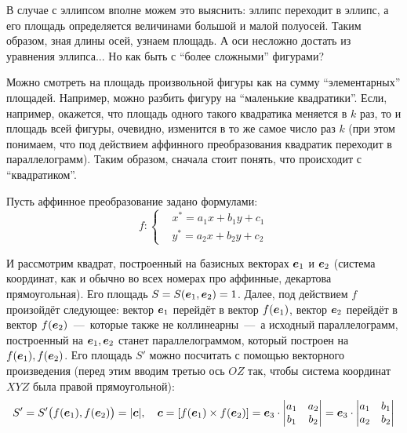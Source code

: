 \documentclass[a4paper,12pt]{article}
\begin{document}
  В случае с эллипсом вполне можем это выяснить: эллипс переходит в эллипс, а его площадь определяется величинами большой и малой полуосей.
  Таким образом, зная длины осей, узнаем площадь.
  А оси несложно достать из уравнения эллипса...
  Но как быть с ``более сложными'' фигурами?
  
  Можно смотреть на площадь произвольной фигуры как на сумму ``элементарных'' площадей.
  Например, можно разбить фигуру на ``маленькие квадратики''.
  Если, например, окажется, что площадь одного такого квадратика меняется в $k$ раз, то и площадь всей фигуры, очевидно, изменится в то же самое число раз $k$ (при этом понимаем, что под действием аффинного преобразования квадратик переходит в параллелограмм).
  Таким образом, сначала стоит понять, что происходит с ``квадратиком''.
  
  Пусть аффинное преобразование задано формулами:
  \begin{equation}\label{eq:affine-for-square-and-length}
    f\colon \left\{
      \begin{aligned}
        &x^* = a_1 x + b_1 y + c_1\\
        &y^* = a_2 x + b_2 y + c_2
      \end{aligned}
    \right.
  \end{equation}
  
  И рассмотрим квадрат, построенный на базисных векторах $\boldsymbol e_1$ и $\boldsymbol e_2$ (система координат, как и обычно во всех номерах про аффинные, декартова прямоугольная).
  Его площадь $S \hm= S(\bds e_1, \bds e_2) \hm= 1$.
  Далее, под действием $f$ произойдёт следующее: вектор $\boldsymbol e_1$ перейдёт в вектор $f(\boldsymbol e_1)$, вектор $\boldsymbol e_2$ перейдёт в вектор $f(\boldsymbol e_2)$~---~которые также не коллинеарны~---~а исходный параллелограмм, построенный на $\boldsymbol e_1, \boldsymbol e_2$ станет параллелограммом, который построен на $f(\boldsymbol e_1), f(\boldsymbol e_2)$.
  Его площадь $S'$ можно посчитать с помощью векторного произведения (перед этим вводим третью ось $OZ$ так, чтобы система координат $XYZ$ была правой прямоугольной):
  \[
    S' = S'\bigl(f(\boldsymbol e_1), f(\boldsymbol e_2)\bigr) = |\boldsymbol c|,\quad \boldsymbol c = [f(\boldsymbol e_1) \times f(\boldsymbol e_2)] = \boldsymbol e_3 \cdot \begin{vmatrix}
      a_1 & a_2\\
      b_1 & b_2
    \end{vmatrix} = \boldsymbol e_3 \cdot \begin{vmatrix}
      a_1 & b_1\\
      a_2 & b_2
    \end{vmatrix}
  \]
  
\end{document}
